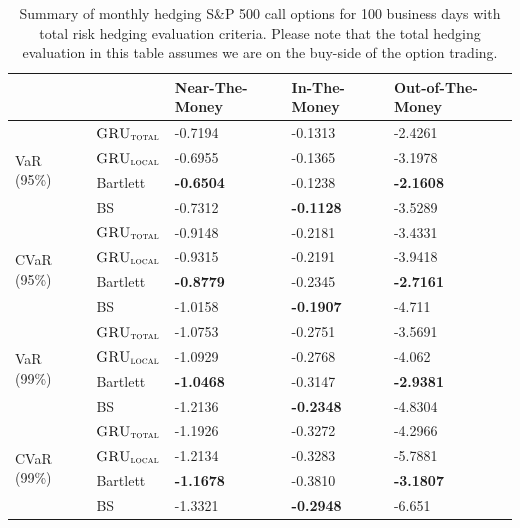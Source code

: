 \documentclass[letterpaper,12pt,titlepage,oneside,final]{book}
\numberwithin{equation}{section}
\theoremstyle{definition}
\newcommand{\modelT}{\textsc{GRU}_{\textsc{total}}}
\newcommand{\modelL}{\textsc{GRU}_{\textsc{local}}}
\begin{document}
\begin{table}[htp!]
	\centering
	\begin{tabular}{ll|l|l|l|}
		\cline{3-5}
		&          & Near-The-Money   & In-The-Money     & Out-of-The-Money \\ \hline
		\multicolumn{1}{|l|}{\multirow{4}{*}{VaR (95\%)}}     & $\modelT$    & -0.7194  		& -0.1313 		   			&-2.4261       \\  
		\multicolumn{1}{|l|}{}                                & $\modelL$    & -0.6955			& -0.1365 		   			&-3.1978 \\  
		\multicolumn{1}{|l|}{}                                & Bartlett 	 &\textbf{-0.6504} 	&-0.1238 		   			&\textbf{-2.1608}          \\  
		\multicolumn{1}{|l|}{}                                & BS       	 & -0.7312 			&\textbf{-0.1128} 		   & -3.5289        \\ 
		\hline 
		\multicolumn{1}{|l|}{\multirow{4}{*}{CVaR (95\%)}}    & $\modelT$    &-0.9148 			&-0.2181 		   		  &-3.4331 \\  
		\multicolumn{1}{|l|}{}                                & $\modelL$    &-0.9315 			&-0.2191 		   		   &-3.9418         \\  
		\multicolumn{1}{|l|}{}                                & Bartlett 	 &\textbf{-0.8779}  &-0.2345           		   &\textbf{-2.7161}          \\  
		\multicolumn{1}{|l|}{}                                & BS       	 &-1.0158 			&\textbf{-0.1907} 		   &-4.711          \\ 
		\hline
		\multicolumn{1}{|l|}{\multirow{4}{*}{VaR (99\%)}}     & $\modelT$    & -1.0753 			& -0.2751 		   			&-3.5691       \\  
		\multicolumn{1}{|l|}{}                                & $\modelL$    &-1.0929 			&-0.2768 		   			&-4.062         \\  
		\multicolumn{1}{|l|}{}                                & Bartlett 	 &\textbf{-1.0468}  &-0.3147           			&\textbf{-2.9381}         \\  
		\multicolumn{1}{|l|}{}                                & BS       	 &-1.2136 			& \textbf{-0.2348} 		    & -4.8304         \\ 
		\hline
		\multicolumn{1}{|l|}{\multirow{4}{*}{CVaR (99\%)}}    & $\modelT$    &-1.1926 			&-0.3272 		    & -4.2966          \\  
		\multicolumn{1}{|l|}{}                                & $\modelL$    &-1.2134 			&-0.3283 		    & -5.7881         \\  
		\multicolumn{1}{|l|}{}                                & Bartlett 	 &\textbf{-1.1678}  &-0.3810            &\textbf{-3.1807}          \\  
		\multicolumn{1}{|l|}{}                                & BS       	 &-1.3321 			&\textbf{-0.2948}   & -6.651          \\ 
		\hline
	\end{tabular}
	\caption{Summary of monthly hedging S\&P 500 call options for 100 business days with total risk hedging evaluation criteria. Please note that the total hedging evaluation in this table assumes we are on the buy-side of the option trading.} \label{table:CallTotalMBuy}
\end{table}
\end{document}
